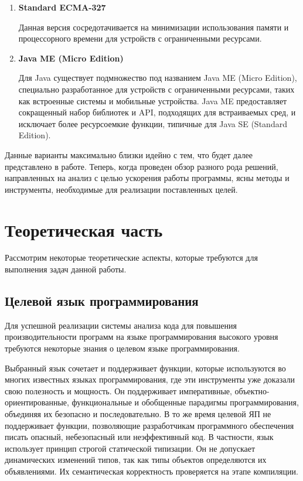 \documentclass{mipt-thesis-bs}
\begin{document}
\begin{enumerate}
        \item \textbf{Standard ECMA-327}

        Данная версия сосредотачивается на минимизации использования памяти и
        процессорного времени для устройств с ограниченными ресурсами.

        \item \textbf{Java ME (Micro Edition)}

        Для Java существует подмножество под названием Java ME (Micro Edition),
        специально разработанное для устройств с ограниченными ресурсами, таких
        как встроенные системы и мобильные устройства. Java ME предоставляет
        сокращенный набор библиотек и API, подходящих для встраиваемых сред,
        и исключает более ресурсоемкие функции, типичные для Java SE (Standard Edition).
\end{enumerate}

Данные варианты максимально близки идейно с тем, что будет далее представлено в работе.
Теперь, когда проведен обзор разного рода решений, направленных на анализ с целью ускорения
работы программы, ясны методы и инструменты, необходимые для реализации поставленных целей.


\chapter{Теоретическая часть}

Рассмотрим некоторые теоретические аспекты, которые требуются для
выполнения задач данной работы.

\section{Целевой язык программирования}

Для успешной реализации системы анализа кода для повышения производительности программ на
языке программирования высокого уровня требуются некоторые знания о целевом языке программирования.

Выбранный язык сочетает и поддерживает функции, которые используются во многих известных
языках программирования, где эти инструменты уже доказали свою полезность и мощность.
Он поддерживает императивные, объектно-ориентированные, функциональные и обобщенные
 парадигмы программирования, объединяя их безопасно и последовательно.
В то же время целевой ЯП не поддерживает функции, позволяющие разработчикам
программного обеспечения писать опасный, небезопасный или неэффективный код.
В частности, язык использует принцип строгой статической типизации. Он не допускает
динамических изменений типов, так как типы объектов определяются их объявлениями.
Их семантическая корректность проверяется на этапе компиляции.
\end{document}
